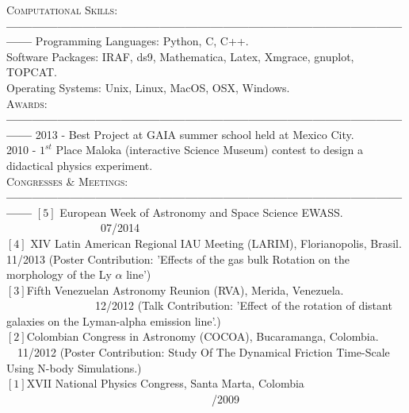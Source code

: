\documentclass[letterpaper]{article}
\begin{document}
\textsc{\Large Computational Skills}:\\
{\bf---------------------------------------------------------------------------------------------------}
Programming Languages: Python, C, C++.\\
Software Packages: IRAF, ds9, Mathematica, Latex, Xmgrace, gnuplot, TOPCAT.\\
Operating Systems: Unix, Linux, MacOS, OSX, Windows.\\

\textsc{\Large Awards:}\\
{\bf---------------------------------------------------------------------------------------------------}
2013 - Best Project at GAIA summer school held at Mexico City.\\
2010 - $1^{st}$ Place Maloka (interactive Science Museum) contest to design a didactical physics experiment.\\ 

\textsc{\Large Congresses \& Meetings:}\\
{\bf---------------------------------------------------------------------------------------------------}
$\left[5\right]$ European Week of Astronomy and Space Science EWASS.  \indent \ \ \ \ \ \ \ \ \ \ \ \ \ \ \ \ \ 07/2014 \\
$\left[4\right]$ XIV Latin American Regional IAU Meeting (LARIM), Florianopolis, Brasil.  11/2013
\normalsize {(Poster Contribution: 'Effects of the gas bulk Rotation on the morphology of the Ly $\alpha$ line')}\\
$\left[3\right]$\large{Fifth Venezuelan Astronomy Reunion (RVA), Merida, Venezuela. \indent \ \ \ \  \ \ \ \ \ \ \ \ \ \ \ \ 12/2012}
\normalsize{(Talk Contribution: 'Effect of the rotation of distant galaxies on the Lyman-alpha emission line'.)}\\
$\left[2\right]$\large{Colombian Congress in Astronomy (COCOA), Bucaramanga, Colombia. \indent \ \ 11/2012} 
\normalsize{(Poster Contribution: Study Of The Dynamical Friction Time-Scale Using N-body Simulations.)}\\
$\left[1\right]$\large{XVII National Physics Congress, Santa Marta, Colombia \indent \ \ \ \ \ \ \ \ \ \ \ \ \ \ \ \ \  \ \ \ \ \ \ \ \ \ \ \ \ \ \ \ \ \ \ \ \   /2009}\\
\end{document}
